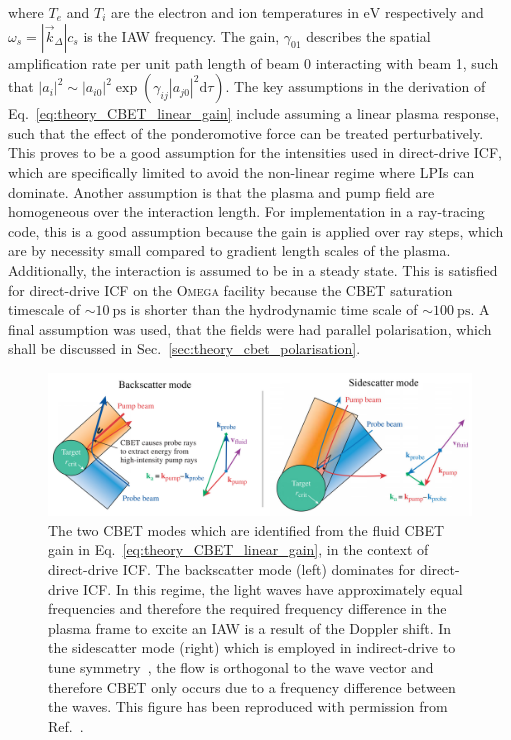 where $T_e$ and $T_i$ are the electron and ion temperatures in $\text{eV}$ respectively and $\omega_s = |\vec{k}_\Delta|c_s$ is the \ac{IAW} frequency.
The gain, $\gamma_{01}$ describes the spatial amplification rate per unit path length of beam 0 interacting with beam 1, such that $|a_i|^2\sim |a_{i0}|^2\exp{(\gamma_{ij}|a_{j0}|^2 \text{d}\tau)}$.
The key assumptions in the derivation of Eq.~\ref{eq:theory_CBET_linear_gain} include assuming a linear plasma response, such that the effect of the ponderomotive force can be treated perturbatively.
This proves to be a good assumption for the intensities used in direct-drive \ac{ICF}, which are specifically limited to avoid the non-linear regime where \ac{LPIs} can dominate.
Another assumption is that the plasma and pump field are homogeneous over the interaction length.
For implementation in a ray-tracing code, this is a good assumption because the gain is applied over ray steps, which are by necessity small compared to gradient length scales of the plasma.
Additionally, the interaction is assumed to be in a steady state.
This is satisfied for direct-drive \ac{ICF} on the \textsc{Omega} facility because the \ac{CBET} saturation timescale of $\sim10\ \text{ps}$ is shorter than the hydrodynamic time scale of $\sim100\ \text{ps}$.
A final assumption was used, that the fields were had parallel polarisation, which shall be discussed in Sec.~\ref{sec:theory_cbet_polarisation}. 

\begin{figure}[t!]
    \includegraphics[width=\linewidth]{Theory/Images/CBET_modes.png}
    \centering
    \caption{The two \ac{CBET} modes which are identified from the fluid \ac{CBET} gain in Eq.~\ref{eq:theory_CBET_linear_gain}, in the context of direct-drive \ac{ICF}.
    The backscatter mode (left) dominates for direct-drive \ac{ICF}.
    In this regime, the light waves have approximately equal frequencies and therefore the required frequency difference in the plasma frame to excite an \ac{IAW} is a result of the Doppler shift.
    In the sidescatter mode (right) which is employed in indirect-drive to tune symmetry~\cite{michel_tuning_2009}, the flow is orthogonal to the wave vector and therefore \ac{CBET} only occurs due to a frequency difference between the waves.
    This figure has been reproduced with permission from Ref.~\cite{marozas_wavelengthdetuning_2018}.
    }%
    \label{fig:theory_CBET_modes}
\end{figure}

